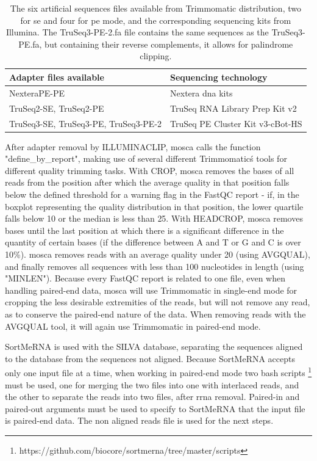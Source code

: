 \documentclass[
  oneside,
  11pt, a4paper,
  footinclude=true,
  headinclude=true,
  cleardoublepage=empty
]{scrbook}
\begin{document}
    \begin{table}[]
    \centering
    \caption{The six artificial sequences files available from Trimmomatic distribution, two for \gls{se} and four for \gls{pe} mode, and the corresponding sequencing kits from Illumina.  The TruSeq3-PE-2.fa file contains the same sequences as the TruSeq3-PE.fa, but containing their reverse complements, it allows for palindrome clipping.}
    \label{adapter_files}
    \begin{tabular}{ll}
    \hline
    Adapter files available              & Sequencing technology            \\ \hline
    NexteraPE-PE                         & Nextera \gls{dna} kits                 \\
    TruSeq2-SE, TruSeq2-PE               & TruSeq RNA Library Prep Kit v2   \\
    TruSeq3-SE, TruSeq3-PE, TruSeq3-PE-2 & TruSeq PE Cluster Kit v3-cBot-HS \\ \hline
    \end{tabular}
    \end{table}
    
    After adapter removal by ILLUMINACLIP, \gls{mosca} calls the function "define\_by\_report", making use of several different Trimmomatic\'s tools for different quality trimming tasks. With CROP, \gls{mosca} removes the bases of all reads from the position after which the average quality in that position falls below the defined threshold for a warning flag in the FastQC report - if, in the boxplot representing the quality distribution in that position, the lower quartile falls below 10 or the median is less than 25. With HEADCROP, \gls{mosca} removes bases until the last position at which there is a significant difference in the quantity of certain bases (if the difference between A and T or G and C is over 10\%). \gls{mosca} removes reads with an average quality under 20 (using AVGQUAL), and finally removes all sequences with less than 100 nucleotides in length (using "MINLEN"). Because every FastQC report is related to one file, even when handling paired-end data, \gls{mosca} will use Trimmomatic in single-end mode for cropping the less desirable extremities of the reads, but will not remove any read, as to conserve the paired-end nature of the data. When removing reads with the AVGQUAL tool, it will again use Trimmomatic in paired-end mode.
    
    SortMeRNA is used with the SILVA database, separating the sequences aligned to the database from the sequences not aligned. Because SortMeRNA accepts only one input file at a time, when working in paired-end mode two bash scripts \footnote{https://github.com/biocore/sortmerna/tree/master/scripts} must be used, one for merging the two files into one with interlaced reads, and the other to separate the reads into two files, after \gls{rrna} removal. Paired-in and paired-out arguments must be used to specify to SortMeRNA that the input file is paired-end data. The non aligned reads file is used for the next steps.
    
\end{document}
